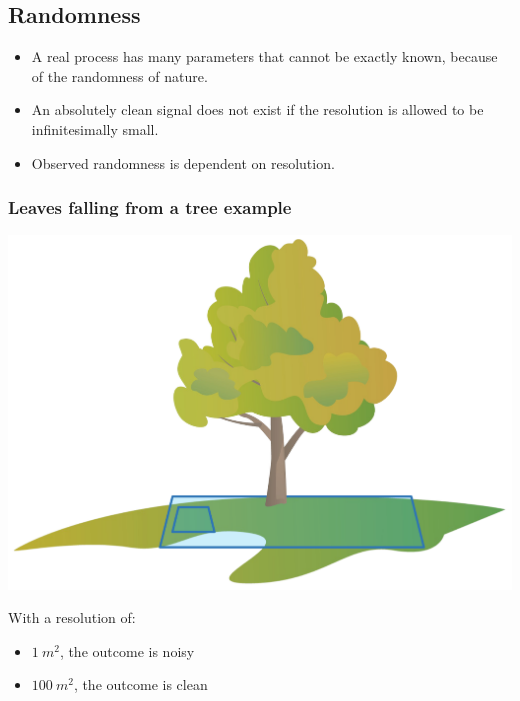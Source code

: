 \documentclass[11pt]{article}
\begin{document}
\subsection{Randomness}
\label{sec:orgdd2be30}
\begin{itemize}
\item A real process has many parameters that cannot be exactly known, because of the randomness of nature.
\item An absolutely clean signal does not exist if the resolution is allowed to be infinitesimally small.
\item Observed randomness is dependent on resolution.
\end{itemize}
\subsubsection{Leaves falling from a tree example}
\label{sec:orga05813e}
\begin{center}
\includegraphics[width=.9\linewidth]{./images/leaves-falling-from-a-tree-signal.png}
\end{center}

With a resolution of:
\begin{itemize}
\item \(\qty{1}{m^2}\), the outcome is noisy
\item \(\qty{100}{m^2}\), the outcome is clean
\end{itemize}

 \newpage
\end{document}

